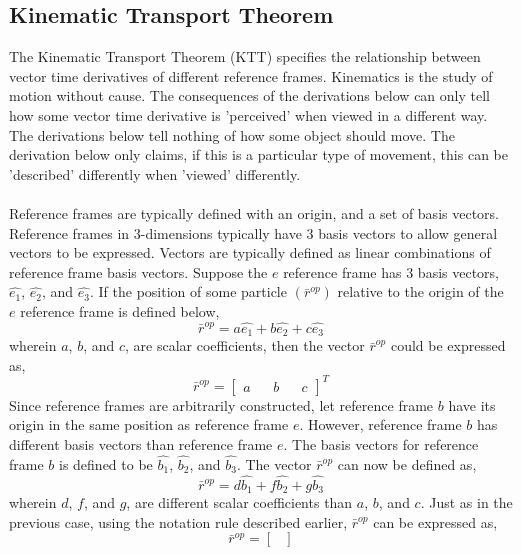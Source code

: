 \documentclass[class=report, 12pt, crop=false]{standalone}
\begin{document}
\begin{center}

\chapter{Kinematic Transport Theorem}
\begin{comment}
\end{comment}
The Kinematic Transport Theorem (KTT) specifies the relationship between vector time derivatives of different reference frames. Kinematics is the study of motion without cause. The consequences of the derivations below can only tell how some vector time derivative is 'perceived' when viewed in a different way. The derivations below tell nothing of how some object should move. The derivation below only claims, if this is a particular type of movement, this can be 'described' differently when 'viewed' differently.
\\~\\Reference frames are typically defined with an origin, and a set of basis vectors. Reference frames in $3$-dimensions typically have $3$ basis vectors to allow general vectors to be expressed. Vectors are typically defined as linear combinations of reference frame basis vectors. Suppose the $e$ reference frame has $3$ basis vectors, $\hat{e_{1}}$, $\hat{e_{2}}$, and $\hat{e_{3}}$. If the position of some particle $\left(\bar{r}^{op}\right)$ relative to the origin of the $e$ reference frame is defined below,
$$\bar{r}^{op} = a\hat{e_{1}} + b\hat{e_{2}} + c\hat{e_{3}}$$
wherein $a$, $b$, and $c$, are scalar coefficients, then the vector $\bar{r}^{op}$ could be expressed as,
$$\bar{r}^{op} = \begin{bmatrix}
a && b && c
\end{bmatrix}^{T}$$
Since reference frames are arbitrarily constructed, let reference frame $b$ have its origin in the same position as reference frame $e$. However, reference frame $b$ has different basis vectors than reference frame $e$. The basis vectors for reference frame $b$ is defined to be $\hat{b_{1}}$, $\hat{b_{2}}$, and $\hat{b_{3}}$. The vector $\bar{r}^{op}$ can now be defined as,
$$\bar{r}^{op} = d\hat{b_{1}} + f\hat{b_{2}} + g\hat{b_{3}}$$
wherein $d$, $f$, and $g$, are different scalar coefficients than $a$, $b$, and $c$. Just as in the previous case, using the notation rule described earlier, $\bar{r}^{op}$ can be expressed as,
$$\bar{r}^{op} = \begin{bmatrix}

\end{bmatrix}$$
\end{center}
\end{document}
